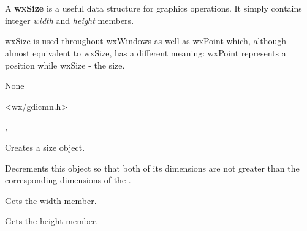 \section{}\label{wxsize}

A {\bf wxSize} is a useful data structure for graphics operations.
It simply contains integer {\it width} and {\it height} members.

wxSize is used throughout wxWindows as well as wxPoint which, although almost
equivalent to wxSize, has a different meaning: wxPoint represents a position
while wxSize - the size.



None


<wx/gdicmn.h>


, 





Creates a size object.


\label{wxsizedecto}


Decrements this object so that both of its dimensions are not greater than the
corresponding dimensions of the .




\label{wxsizegetwidth}


Gets the width member.

\label{wxsizegetheight}


Gets the height member.


\label{wxsizeincto}

